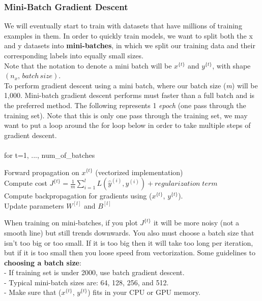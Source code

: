 \documentclass[11pt, a4paper]{article}
\begin{document}
\begin{spacing}{1.1}
	\subsubsection{Mini-Batch Gradient Descent}
	We will eventually start to train with datasets that have millions of training examples in them. In order to quickly train models, we want to split both the x and y datasets into \textbf{mini-batches}, in which we split our training data and their corresponding labels into equally small sizes. \vspace*{1mm} \\ Note that the notation to denote a mini batch will be $x^{\{t\}}$ and $y^{\{t\}}$, with shape $(n_x,\, batch\, size)$. \vspace*{2mm} \\
	To perform gradient descent using a mini batch, where our batch size (\textit{m}) will be 1,000. Mini-batch gradient descent performs must faster than a full batch and is the preferred method. The following represents 1 \textit{epoch} (one pass through the training set). Note that this is only one pass through the training set, we may want to put a loop around the for loop below in order to take multiple steps of gradient descent. \\~\\ for t=1, ..., num\_of\_batches
	\begin{center}
	Forward propagation on $x^{\{t\}}$ (vectorized implementation) \vspace*{1mm} \\
	Compute cost $J^{\{t\}} = \frac{1}{m} \sum_{i=1}^{l} L(\hat{y}^{(i)}, y^{(i)}) + regularization\; term $ \vspace*{1mm} \\
	Compute backpropagation for gradients using ($x^{\{t\}}$, $y^{\{t\}}$). \vspace*{1mm} \\
	Update parameters $W^{[l]}$ and $B^{[l]}$ \vspace*{1mm} \\
	\end{center}
	When training on mini-batches, if you plot $J^{\{t\}}$ it will be more noisy (not a smooth line) but still trends downwards. You also must choose a batch size that isn't too big or too small. If it is too big then it will take too long per iteration, but if it is too small then you loose speed from vectorization. Some guidelines to \textbf{choosing a batch size}: \\
	\hspace*{3mm} - If training set is under 2000, use batch gradient descent. \\
	\hspace*{3mm} - Typical mini-batch sizes are: 64, 128, 256, and 512. \\
	\hspace*{3mm} - Make sure that ($x^{\{t\}}$, $y^{\{t\}}$) fits in your CPU or GPU memory.

\end{spacing}
\end{document}
